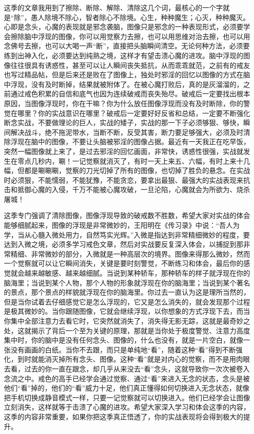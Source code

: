 这季的文章我用到了擦除、断除、解除、清除这几个词，最核心的一个字就是“除”，愚人除境不除心，智者除心不除境。心生，种种魔生；心灭，种种魔灭。心即是念头，心魔的表现就是邪念袭脑，图像只是邪念的一种表现形式，必须要学会擦除脑中浮现的图像，你可以用觉察力去擦，也可以用思维对治去擦，也可以用念佛号去擦，也可以大喝一声“断”，直接把头脑瞬间清空。无论何种方法，必须要练到出神入化，必须要达到纯熟之境，这样才有望击溃心魔的进攻。脑中浮现的图像往往很具有诱惑性，甚至可以让人瞬间丧失抵抗，从而乖乖就范，之前有的戒友也写过精品帖，但是后来还是败在了图像上，独处时邪淫的回忆以图像的方式在脑中浮现，没有及时断掉，结果就被附体了。在被心魔打败后，真的是灰溜溜的，之前通过戒色积累的自信和底气也因为连续破戒而丧失殆尽。破戒后一定要找出根本原因，当图像浮现时，你在干嘛？你为什么放任图像浮现而没有及时断除，你的警觉在哪里？你的实战意识在哪里？破戒后一定要好好反省和总结，一定要不断强化断念实战，不要做理论的巨人，实战的矮子，实战的那一下子必须够狠、够快，瞬间解决战斗，绝不拖泥带水，当断不断，反受其害，断力要足够强大，必须及时清除浮现在脑中的图像，不要让头脑被邪淫的图像占据。最近有一天我正在吃早饭，突然一幅图像就上来了，是过去邪淫的回忆画面，非常快，诱惑性很强，实战就发生在零点几秒内，唰！一记觉察就消灭了，有时一天上来五、六幅，有时上来十几幅，但都是唰唰唰，觉察的刀光切掉了所有的图像，也切掉了胜负的悬念。在实战时必须狠，不能懦弱，不能犹豫，不能贪恋，要拿出最狠、最强大的实战表现来抗击和抵御心魔的入侵，千万不能被心魔攻破，一旦沦陷，心魔就会为所欲为、烧杀屠城！

这季专门强调了清除图像，图像浮现导致的破戒数不胜数，希望大家对实战的体会能够细腻起来，图像的浮现是非常微妙的，王阳明在《传习录》中说：“吾人为学，当从心髓入微处用力，自然笃实光辉。”入微是指达到非常精细微妙的程度，要达到入微之境，必须多学习戒色文章，然后对实战要反复深入体会，以捕捉到那非常精细、非常微妙的部分，入微就是一种高层次的境界。图像来得那么微妙，然而一个觉察就可以让它瞬间消失，关键是要时刻警觉，不断练习和体会，最后你的感觉就会越来越敏感、越来越细腻。当说到某种轿车，那种轿车的样子就浮现在你的脑海里；当说到某个人物，那个人物的形象就浮现在你的脑海里；当说到某个著名的景点，那个景点的样貌就浮现在你的脑海里。你过去一直认为这是理所当然的，但是当你试着去仔细感觉它是怎么浮现的，它又是怎么消失的，就会发现那个过程是极其微妙的。当你跟随图像，它就会继续浮现，以你想象的方式浮现下去，而当你集中全部注意力去看它时，它突然就消失了，消失得无影无踪，这就是最奇妙之处，这就揭示了背后一个至为关键的原理，那就是当你处于极度警觉、注意力高度集中时，你的脑中是没有任何念头、图像的，什么也没有，就是一片空白，就像一张没有画画的白纸。当你不去跟，而只是单纯地“看”，随着这种“看”得到不断强化，到时就能消灭掉所有念头、图像。这种“看”就是对内心的觉察，而不是用肉眼去看，过去的你一直在跟念，却几乎从来没去“看”念头，这就导致你一次次被卷入念流之中。戒色的高手已经学会通过觉察、通过“看”来进入无念的状态，念头是被他们“看”掉的，他们的“看”威力十足，他们真正懂得如何切换进入无念状态，就像把手机切换成静音模式一样，只要一记觉察就可以切换进入。他们已经学会让图像立刻消失，这样就等于击溃了心魔的进攻。希望大家深入学习和体会这季的内容，这季的内容非常重要，如果你把这季真正悟透了，你的实战表现将会得到极大的提升。

